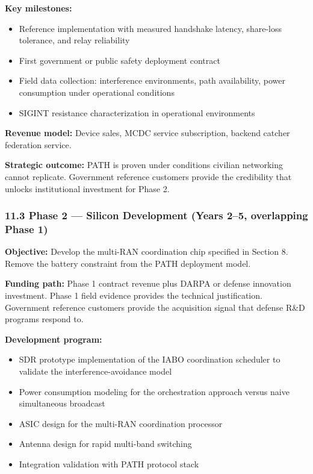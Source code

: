 \documentclass[
  11pt,
]{article}
\providecommand{\tightlist}{%
  \setlength{\itemsep}{0pt}\setlength{\parskip}{0pt}}
\begin{document}
\textbf{Key milestones:}

\begin{itemize}
\tightlist
\item
  Reference implementation with measured handshake latency, share-loss
  tolerance, and relay reliability
\item
  First government or public safety deployment contract
\item
  Field data collection: interference environments, path availability,
  power consumption under operational conditions
\item
  SIGINT resistance characterization in operational environments
\end{itemize}

\textbf{Revenue model:} Device sales, MCDC service subscription, backend
catcher federation service.

\textbf{Strategic outcome:} PATH is proven under conditions civilian
networking cannot replicate. Government reference customers provide the
credibility that unlocks institutional investment for Phase 2.

\hypertarget{phase-2-silicon-development-years-25-overlapping-phase-1}{%
\subsubsection{11.3 Phase 2 --- Silicon Development (Years 2--5,
overlapping Phase
1)}\label{phase-2-silicon-development-years-25-overlapping-phase-1}}

\textbf{Objective:} Develop the multi-RAN coordination chip specified in
Section 8. Remove the battery constraint from the PATH deployment model.

\textbf{Funding path:} Phase 1 contract revenue plus DARPA or defense
innovation investment. Phase 1 field evidence provides the technical
justification. Government reference customers provide the acquisition
signal that defense R\&D programs respond to.

\textbf{Development program:}

\begin{itemize}
\tightlist
\item
  SDR prototype implementation of the IABO coordination scheduler to
  validate the interference-avoidance model
\item
  Power consumption modeling for the orchestration approach versus naive
  simultaneous broadcast
\item
  ASIC design for the multi-RAN coordination processor
\item
  Antenna design for rapid multi-band switching
\item
  Integration validation with PATH protocol stack
\end{itemize}
\end{document}
